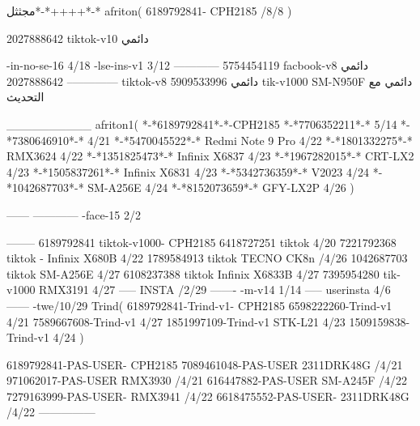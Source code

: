 مجثثل*-*++++*-*
afriton(
6189792841- CPH2185  /8/8
)

2027888642 tiktok-v10
دائمي

-in-no-se-16 4/18
-lse-ins-v1 3/12
------------
5754454119 facbook-v8
دائمي
--------------
2027888642 tiktok-v8
دائمي
5909533996 tik-v1000  SM-N950F
دائمي مع التحديث

__________
afriton1(
*-*6189792841*-*-CPH2185
*-*7706352211*-* 5/14
*-*7380646910*-* 4/21
*-*5470045522*-* Redmi Note 9 Pro 4/22
*-*1801332275*-* RMX3624 4/22
*-*1351825473*-* Infinix X6837 4/23
*-*1967282015*-* CRT-LX2 4/23
*-*1505837261*-* Infinix X6831 4/23
*-*5342736359*-* V2023 4/24
*-*1042687703*-* SM-A256E 4/24
*-*8152073659*-* GFY-LX2P 4/26
)


------
------------
-face-15 2/2

--------
6189792841 tiktok-v1000- CPH2185 
6418727251 tiktok 4/20
7221792368 tiktok - Infinix X680B  4/22 
1789584913 tiktok TECNO CK8n /4/26
1042687703 tiktok SM-A256E 4/27
6108237388 tiktok  Infinix X6833B 4/27
7395954280 tik-v1000  RMX3191 4/27
-----
 INSTA /2/29
-------
-m-v14 1/14
-----
userinsta 4/6
------
-twe/10/29
Trind(
6189792841-Trind-v1- CPH2185 
6598222260-Trind-v1  4/21
7589667608-Trind-v1  4/27
1851997109-Trind-v1 STK-L21 4/23
1509159838-Trind-v1  4/24
)

6189792841-PAS-USER- CPH2185 
7089461048-PAS-USER 2311DRK48G /4/21
971062017-PAS-USER RMX3930 /4/21
616447882-PAS-USER SM-A245F /4/22
7279163999-PAS-USER- RMX3941 /4/22
6618475552-PAS-USER- 2311DRK48G /4/22
    ---------------
